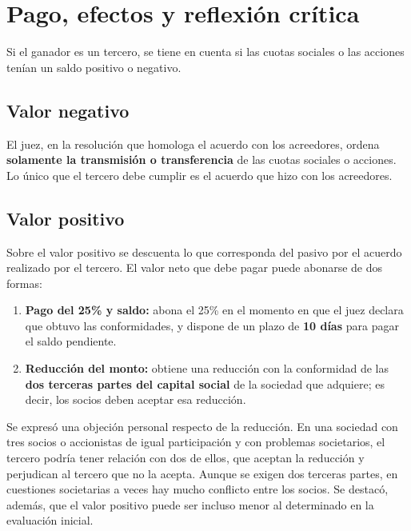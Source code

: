 \documentclass[12pt,oneside]{book}
\begin{document}
\section{Pago, efectos y reflexión crítica}

Si el ganador es un tercero, se tiene en cuenta si las cuotas sociales o las acciones tenían un saldo positivo o negativo.

\subsection{Valor negativo}

El juez, en la resolución que homologa el acuerdo con los acreedores, ordena \textbf{solamente la transmisión o transferencia} de las cuotas sociales o acciones. Lo único que el tercero debe cumplir es el acuerdo que hizo con los acreedores.

\subsection{Valor positivo}

Sobre el valor positivo se descuenta lo que corresponda del pasivo por el acuerdo realizado por el tercero. El valor neto que debe pagar puede abonarse de dos formas:

\begin{enumerate}
    \item \textbf{Pago del 25\% y saldo:} abona el 25\% en el momento en que el juez declara que obtuvo las conformidades, y dispone de un plazo de \textbf{10 días} para pagar el saldo pendiente.
    \item \textbf{Reducción del monto:} obtiene una reducción con la conformidad de las \textbf{dos terceras partes del capital social} de la sociedad que adquiere; es decir, los socios deben aceptar esa reducción.
\end{enumerate}

\begin{note}
Se expresó una objeción personal respecto de la reducción. En una sociedad con tres socios o accionistas de igual participación y con problemas societarios, el tercero podría tener relación con dos de ellos, que aceptan la reducción y perjudican al tercero que no la acepta. Aunque se exigen dos terceras partes, en cuestiones societarias a veces hay mucho conflicto entre los socios. Se destacó, además, que el valor positivo puede ser incluso menor al determinado en la evaluación inicial.
\end{note}
\end{document}

